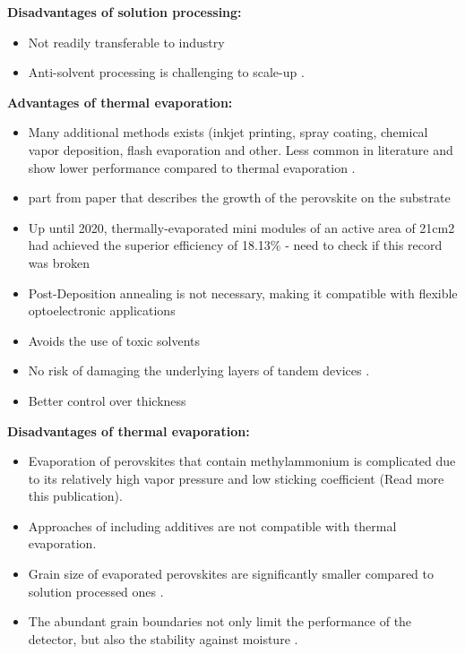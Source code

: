 \textbf{Disadvantages of solution processing:}

\begin{itemize}
    \item Not readily transferable to industry
    \item Anti-solvent processing is challenging to scale-up \cite{Saki2021Solution-processedCells}.
\end{itemize}

\textbf{Advantages of thermal evaporation:}
\begin{itemize}
    \item Many additional methods exists (inkjet printing, spray coating, chemical vapor deposition, flash evaporation and other. Less common in literature and show lower performance compared to thermal evaporation \cite{Vaynzof2020TheProcessing}.
    \item part from paper that describes the growth of the perovskite on the substrate    
    \item Up until 2020, thermally-evaporated mini modules of an active area of 21cm2 had achieved the superior efficiency of 18.13\% \cite{Li2020HighlyMini-modules} - need to check if this record was broken
    \item Post-Deposition annealing is not necessary, making it compatible with flexible optoelectronic applications \cite{Becker2019LowExperimentation}
    \item Avoids the use of toxic solvents \cite{Zhang2020TowardCells} 
    \item No risk of damaging the underlying layers of tandem devices \cite{Forgacs2017EfficientCells}.
    \item Better control over thickness
\end{itemize}


\textbf{Disadvantages of thermal evaporation:}
\begin{itemize}
    \item Evaporation of perovskites that contain methylammonium is complicated due to its relatively high vapor pressure and low sticking coefficient \cite{Kim2020DepositionCH3NH3PbI3Perovskite} (Read more this publication).
    \item Approaches of including additives are not compatible with thermal evaporation. 
    \item Grain size of evaporated perovskites are significantly smaller compared to solution processed ones \cite{Vaynzof2020TheProcessing}.
    \item The abundant grain boundaries not only limit the performance of the detector, but also the stability against moisture \cite{Wang2017Scaling}.
\end{itemize}


